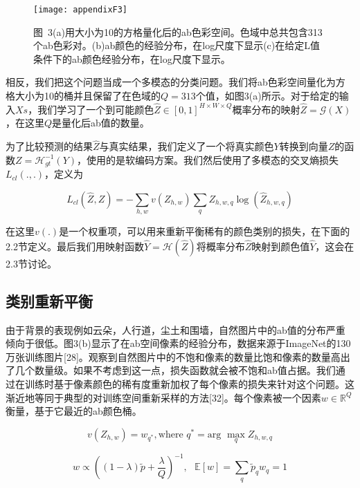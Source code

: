 \begin{figure}[h]
  \centering
  \texttt{[image: appendixF3]}
  \caption*{图~3\quad (a)用大小为10的方格量化后的ab色彩空间。色域中总共包含313个ab色彩对。(b)ab颜色的经验分布，在log尺度下显示(c)在给定L值条件下的ab颜色经验分布，在log尺度下显示。}
  \label{tab:badfigure3}
\end{figure}

相反，我们把这个问题当成一个多模态的分类问题。我们将ab色彩空间量化为方格大小为10的桶并且保留了在色域的$Q = 313$个值，如图3(a)所示。对于给定的输入$Xs$，我们学习了一个到可能颜色$\hat{Z} \in [0,1]^{H \times W \times Q}$概率分布的映射$\hat{Z} = \mathcal{G}(X)$，在这里$Q$是量化后ab值的数量。

为了比较预测的结果$\hat{Z}$与真实结果，我们定义了一个将真实颜色$Y$转换到向量$Z$的函数$Z = \mathcal{H}^{-1}_{gt}(Y)$，使用的是软编码方案。我们然后使用了多模态的交叉熵损失$L_{cl}(.,.)$，定义为

\begin{equation}\tag*{(2)}
L_{cl}(\hat{Z}, Z) = -\sum_{h,w}v(Z_{h,w})\sum_{q}Z_{h,w,q} \log(\hat{Z}_{h,w,q})
\end{equation}

在这里$v(.)$是一个权重项，可以用来重新平衡稀有的颜色类别的损失，在下面的2.2节定义。最后我们用映射函数$\hat{Y}=\mathcal{H}(\hat{Z})$将概率分布$\hat{Z}$映射到颜色值$\hat{Y}$，这会在2.3节讨论。

\subsection{类别重新平衡}

由于背景的表现例如云朵，人行道，尘土和围墙，自然图片中的ab值的分布严重倾向于很低。图3(b)显示了在ab空间像素的经验分布，数据来源于ImageNet的130万张训练图片[28]。观察到自然图片中的不饱和像素的数量比饱和像素的数量高出了几个数量级。如果不考虑到这一点，损失函数就会被不饱和ab值占据。我们通过在训练时基于像素颜色的稀有度重新加权了每个像素的损失来针对这个问题。这渐近地等同于典型的对训练空间重新采样的方法[32]。每个像素被一个因素$w \in \mathbb{R}^Q$衡量，基于它最近的ab颜色桶。

\begin{equation}\tag*{(3)}
v(Z_{h,w}) = w_{q^*}, \text{where } q^* = \text{arg } \max\limits_{q} Z_{h,w,q}
\end{equation}

\begin{equation}\tag*{(4)}
w \propto ((1-\lambda)\tilde{p}+\frac{\lambda}{Q})^{-1},\text{ } \mathbb{E}[w] = \sum_{q}\tilde{p}_{q}w_q = 1
\end{equation}

